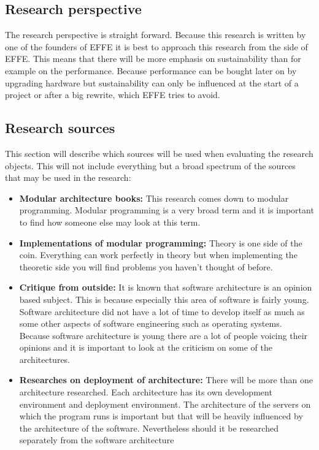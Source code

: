 \subsection{Research perspective}
The research perspective is straight forward. Because this research is written by one of the founders of EFFE it is best to approach this research from the side of EFFE. This means that there will be more emphasis on sustainability than for example on the performance. Because performance can be bought later on by upgrading hardware but sustainability can only be influenced at the start of a project or after a big rewrite, which EFFE tries to avoid.

\subsection{Research sources}
This section will describe which sources will be used when evaluating the research objects. This will not include everything but a broad spectrum of the sources that may be used in the research:

\begin{itemize}
	\item \textbf{Modular architecture books: }This research comes down to modular programming. Modular programming is a very broad term and it is important to find how someone else may look at this term.

	\item \textbf{Implementations of modular programming: }Theory is one side of the coin. Everything can work perfectly in theory but when implementing the theoretic side you will find problems you haven't thought of before.

	\item \textbf{Critique from outside: }It is known that software architecture is an opinion based subject. This is because especially this area of software is fairly young. Software architecture did not have a lot of time to develop itself as much as some other aspects of software engineering such as operating systems. Because software architecture is young there are a lot of people voicing their opinions and it is important to look at the criticism on some of the architectures.

	\item \textbf{Researches on deployment of architecture: } There will be more than one architecture researched. Each architecture has its own development environment and deployment environment. The architecture of the servers on which the program runs is important but that will be heavily influenced by the architecture of the software. Nevertheless should it be researched separately from the software architecture
\end{itemize}

